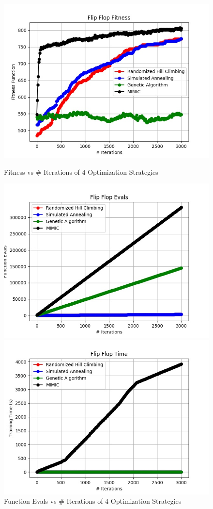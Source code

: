 \documentclass[h]{article}
\begin{document}
 \begin{figure}[H]
      \includegraphics[width=1\textwidth,keepaspectratio]{flip_flop_fitness.jpg} 
      \caption*{Fitness vs # Iterations of 4 Optimization Strategies} 
   \endminipage\hfill
      \includegraphics[width=1\textwidth,keepaspectratio]{flip_flop_evals.jpg} 
      \caption*{Function Evals vs # Iterations of 4 Optimization Strategies} 
   \endminipage\hfill
      \includegraphics[width=1\textwidth,keepaspectratio]{flip_flop_time.jpg} 

\end{figure}
\end{document}
